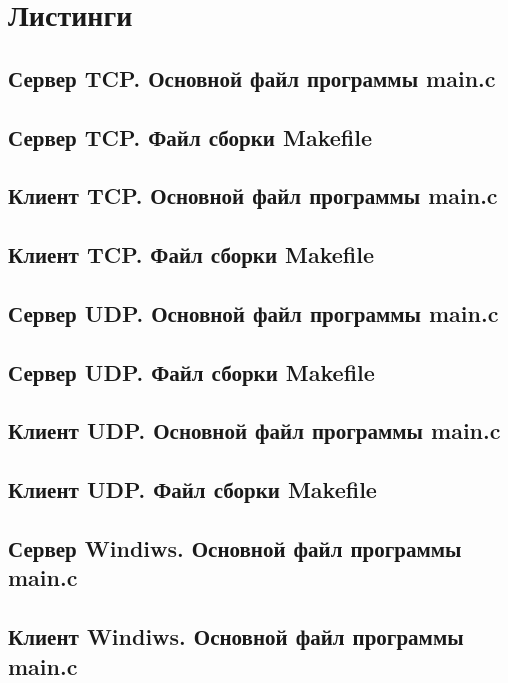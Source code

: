 \documentclass[12pt,a4paper]{report}
\begin{document}
\section{Листинги}
\subsection{Сервер TCP. Основной файл программы main.c}

\subsection{Сервер TCP. Файл сборки Makefile}

\subsection{Клиент TCP. Основной файл программы main.c}

\subsection{Клиент TCP. Файл сборки Makefile}

\subsection{Сервер UDP. Основной файл программы main.c}

\subsection{Сервер UDP. Файл сборки Makefile}

\subsection{Клиент UDP. Основной файл программы main.c}

\subsection{Клиент UDP. Файл сборки Makefile}


\subsection{Сервер Windiws. Основной файл программы main.c}

\subsection{Клиент Windiws. Основной файл программы main.c}


\end{document}
